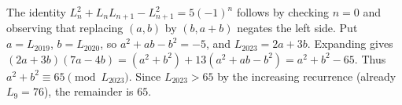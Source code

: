 The identity $L_n^2+L_nL_{n+1}-L_{n+1}^2=5(-1)^n$ follows by checking $n=0$ and observing that replacing $(a,b)$ by $(b,a+b)$ negates the left side. Put $a=L_{2019}$, $b=L_{2020}$, so $a^2+ab-b^2=-5$, and $L_{2023}=2a+3b$. Expanding gives $(2a+3b)(7a-4b)=(a^2+b^2)+13(a^2+ab-b^2)=a^2+b^2-65$. Thus $a^2+b^2\equiv65\pmod{L_{2023}}$. Since $L_{2023}>65$ by the increasing recurrence (already $L_9=76$), the remainder is $\boxed{65}$.
